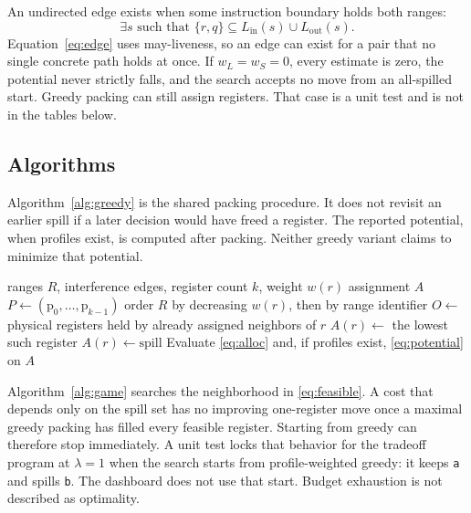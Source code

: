 \documentclass{ieeeaccess}
\begin{document}
An undirected edge exists when some instruction boundary holds both ranges:
\begin{equation}
\label{eq:edge}
\exists s \text{ such that } \{r,q\} \subseteq L_{\mathrm{in}}(s) \cup L_{\mathrm{out}}(s).
\end{equation}
Equation~\eqref{eq:edge} uses may-liveness, so an edge can exist for a pair that no single concrete path holds at once.
If $w_L = w_S = 0$, every estimate is zero, the potential never strictly falls, and the search accepts no move from an all-spilled start.
Greedy packing can still assign registers.
That case is a unit test and is not in the tables below.

\subsection{Algorithms}
\label{sec:algorithms}
Algorithm~\ref{alg:greedy} is the shared packing procedure.
It does not revisit an earlier spill if a later decision would have freed a register.
The reported potential, when profiles exist, is computed after packing.
Neither greedy variant claims to minimize that potential.

\begin{algorithm}[t]
\caption{One-pass greedy packing}
\label{alg:greedy}
\begin{algorithmic}
\REQUIRE ranges $R$, interference edges, register count $k$, weight $w(r)$
\ENSURE assignment $A$
\STATE $P \leftarrow (\mathrm{p}_0,\ldots,\mathrm{p}_{k-1})$
\STATE order $R$ by decreasing $w(r)$, then by range identifier
\STATE $O \leftarrow$ physical registers held by already assigned neighbors of $r$
\STATE $A(r) \leftarrow$ the lowest such register
\ELSE
\STATE $A(r) \leftarrow \mathrm{spill}$
\ENDIF
\ENDFOR
\STATE Evaluate \eqref{eq:alloc} and, if profiles exist, \eqref{eq:potential} on $A$
\end{algorithmic}
\end{algorithm}

Algorithm~\ref{alg:game} searches the neighborhood in \eqref{eq:feasible}.
A cost that depends only on the spill set has no improving one-register move once a maximal greedy packing has filled every feasible register.
Starting from greedy can therefore stop immediately.
A unit test locks that behavior for the tradeoff program at $\lambda = 1$ when the search starts from profile-weighted greedy: it keeps \texttt{a} and spills \texttt{b}.
The dashboard does not use that start.
Budget exhaustion is not described as optimality.
\end{document}
